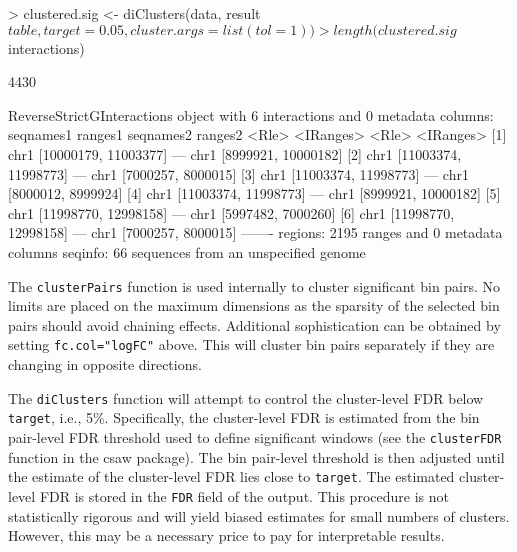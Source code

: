 \documentclass[12pt]{report}
\renewenvironment{Schunk}{\vspace{0pt}}{\vspace{0pt}}
\newcommand{\csaw}{csaw}
\newcommand{\code}[1]{{\small\texttt{#1}}}
\begin{document}
\begin{Schunk}
\begin{Sinput}
> clustered.sig <- diClusters(data, result$table, target=0.05, cluster.args=list(tol=1))
> length(clustered.sig$interactions)
\end{Sinput}
\begin{Soutput}
[1] 4430
\end{Soutput}
\begin{Soutput}
ReverseStrictGInteractions object with 6 interactions and 0 metadata columns:
      seqnames1              ranges1     seqnames2             ranges2
          <Rle>            <IRanges>         <Rle>           <IRanges>
  [1]      chr1 [10000179, 11003377] ---      chr1 [8999921, 10000182]
  [2]      chr1 [11003374, 11998773] ---      chr1 [7000257,  8000015]
  [3]      chr1 [11003374, 11998773] ---      chr1 [8000012,  8999924]
  [4]      chr1 [11003374, 11998773] ---      chr1 [8999921, 10000182]
  [5]      chr1 [11998770, 12998158] ---      chr1 [5997482,  7000260]
  [6]      chr1 [11998770, 12998158] ---      chr1 [7000257,  8000015]
  -------
  regions: 2195 ranges and 0 metadata columns
  seqinfo: 66 sequences from an unspecified genome
\end{Soutput}
\end{Schunk}

The \code{clusterPairs} function is used internally to cluster significant bin pairs. 
No limits are placed on the maximum dimensions as the sparsity of the selected bin pairs should avoid chaining effects.
Additional sophistication can be obtained by setting \code{fc.col="logFC"} above.
This will cluster bin pairs separately if they are changing in opposite directions.

The \code{diClusters} function will attempt to control the cluster-level FDR below \code{target}, i.e., 5\%.
Specifically, the cluster-level FDR is estimated from the bin pair-level FDR threshold used to define significant windows (see the \code{clusterFDR} function in the \csaw{} package).
The bin pair-level threshold is then adjusted until the estimate of the cluster-level FDR lies close to \code{target}.
The estimated cluster-level FDR is stored in the \code{FDR} field of the output.
This procedure is not statistically rigorous and will yield biased estimates for small numbers of clusters.
However, this may be a necessary price to pay for interpretable results.
\end{document}
